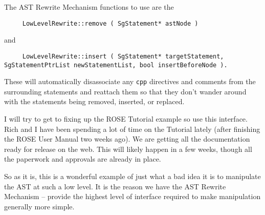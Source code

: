 \begin{enumerate}
The AST Rewrite Mechanism functions to use are the 
{\indent
{\mySmallFontSize
\begin{verbatim}
     LowLevelRewrite::remove ( SgStatement* astNode )
\end{verbatim}
}}
and 
{\indent
{\mySmallFontSize
\begin{verbatim}
     LowLevelRewrite::insert ( SgStatement* targetStatement, SgStatementPtrList newStatementList, bool insertBeforeNode ).
\end{verbatim}
}}

These will automatically disassociate any {\tt cpp} directives and comments
from the surrounding statements and reattach them so that they don't
wander around with the statements being removed, inserted, or replaced.

I will try to get to fixing up the ROSE Tutorial example so use this
interface.  Rich and I have been spending a lot of time on the Tutorial 
lately (after finishing the ROSE User Manual two weeks ago).  We are getting
all the documentation ready for release on the web.  This will likely 
happen in a few weeks, though all the paperwork and approvals are already
in place.

So as it is, this is a wonderful example of just what a bad idea it is
to manipulate the AST at such a low level.
It is the reason we have the AST Rewrite Mechanism -- provide the highest level
of interface required to make manipulation generally more simple.


\end{enumerate}
